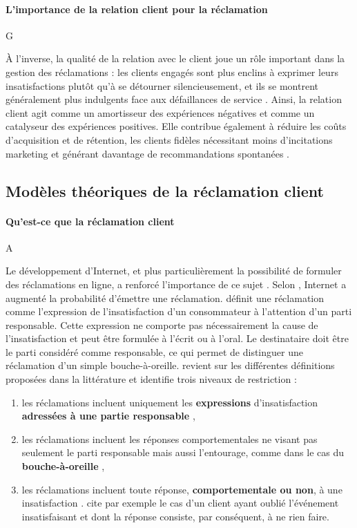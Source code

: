 \documentclass[a4paper,12pt, openany]{book}
\begin{document}
\paragraph{L'importance de la relation client pour la réclamation} G

À l'inverse, la qualité de la relation avec le client joue un rôle important dans la gestion des réclamations : les clients engagés sont plus enclins à exprimer leurs insatisfactions plutôt qu'à se détourner silencieusement, et ils se montrent généralement plus indulgents face aux défaillances de service \parencite{tax98complaint,davidow03}. Ainsi, la relation client agit comme un amortisseur des expériences négatives et comme un catalyseur des expériences positives. Elle contribue également à réduire les coûts d'acquisition et de rétention, les clients fidèles nécessitant moins d'incitations marketing et générant davantage de recommandations spontanées \parencite{reichheld90,brown05}.




\subsection{Modèles théoriques de la réclamation client}


\paragraph{Qu'est-ce que la réclamation client} A

Le développement d'Internet, et plus particulièrement la possibilité de formuler des réclamations en ligne, a renforcé l'importance de ce sujet \parencite{kitapci19}. Selon \textcite{jasper13}, Internet a augmenté la probabilité d'émettre une réclamation. \textcite{landon80} définit une réclamation comme l'expression de l'insatisfaction d'un consommateur à l'attention d'un parti responsable. Cette expression ne comporte pas nécessairement la cause de l'insatisfaction et peut être formulée à l'écrit ou à l'oral. Le destinataire doit être le parti considéré comme responsable, ce qui permet de distinguer une réclamation d'un simple bouche-à-oreille. \textcite{singh88} revient sur les différentes définitions proposées dans la littérature et identifie trois niveaux de restriction :
\begin{enumerate}
	\item les réclamations incluent uniquement les \textbf{expressions} d'insatisfaction \textbf{adressées à une partie responsable} \parencite{landon80, jacoby81},
	\item les réclamations incluent les réponses comportementales ne visant pas seulement le parti responsable mais aussi l'entourage, comme dans le cas du \textbf{bouche-à-oreille} \parencite{richins83, best77, day79},
	\item les réclamations incluent toute réponse, \textbf{comportementale ou non}, à une insatisfaction \parencite{day84, singh88, kitapci19, arora20}. \textcite{day81} cite par exemple le cas d'un client ayant oublié l'événement insatisfaisant et dont la réponse consiste, par conséquent, à ne rien faire.
\end{enumerate}
\end{document}
